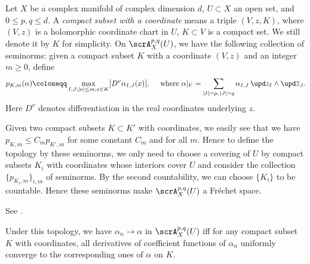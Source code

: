 \begin{construction}[label=\labelNFM{constr:topo-on-forms}, status=draft, tag=0000000]
	Let $X$ be a complex manifold of complex dimension $d$, $U \subset X$ an open set, and $0 \leq p,q \leq d$.
	A \emph{compact subset with a coordinate} means a triple $(V,z,K)$, where $(V,z)$ is a holomorphic coordinate chart in $U$, $K \subset V$ is a compact set.
	We still denote it by $K$ for simplicity.
	On $\scrA_X^{p,q}(U)$, we have the following collection of seminorms:
	given a compact subset $K$ with a coordinate $(V,z)$ and an integer $m \geq 0$, define
	\[ p_{K,m}(\alpha) \coloneqq \max_{I; J; |\nu| \leq m; x \in K} \bigl|D^\nu\alpha_{I,J}(x)\bigr|, \quad \text{ where }\alpha|_V = \sum_{|I| = p,\,|J| = q}\alpha_{I,J}\,\upd z_I \wedge \upd\overline{z}_J. \]
	Here $D^\nu$ denotes differentiation in the real coordinates underlying $z$.

	Given two compact subsets $K \subset K'$ with coordinates, we easily see that we have $p_{K,m} \leq C_m p_{K',m}$ for some constant $C_m$ and for all $m$.
	Hence to define the topology by these seminorms, we only need to choose a covering of $U$ by compact subsets $K_i$ with coordinates whose interiors cover $U$ and consider the collection $\{p_{K_i,m}\}_{i,m}$ of seminorms.
	By the second countability, we can choose $\{K_i\}$ to be countable.
	Hence these seminorms make $\scrA_X^{p,q}(U)$ a Fr\'echet space.

	See \cite[Chapter~I, \S 2]{Demailly-2012-ComplexAnalyticDifferential}.

	Under this topology, we have $\alpha_n \to \alpha$ in $\scrA^{p,q}_X(U)$ iff for any compact subset $K$ with coordinates,
	all derivatives of coefficient functions of $\alpha_n$ uniformly converge to the corresponding ones of $\alpha$ on $K$.
\end{construction}


